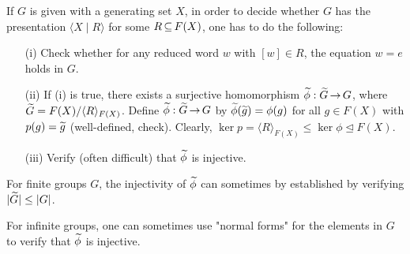 \documentclass[11pt]{book}
\theoremstyle{definition}   \newtheorem{defn}[counter]{Definition} %
\newcommand{\nsg}{\mathrel{\unlhd}}   \newcommand{\ind}{\parindent24pt}   \newcommand{\vn}{\varnothing}
\newcommand{\gen}[1]{\langle #1 \rangle}   \newcommand{\stab}[2]{\tn{Stab}_{#1}(#2)}   \newcommand{\fix}[2]{\tn{Fix}_{#1}(#2)}
\renewcommand{\arrowvert}{\arrow}   \renewcommand{\i}{\mathbf{i}}   \renewcommand{\j}{\mathbf{j}}   \renewcommand{\k}{\mathbf{k}}    \renewcommand{\H}{\mathbb{H}}
\DeclareMathOperator{\ra}{\rightarrow}   \DeclareMathOperator{\Poly}{\mathbf{P}}   \DeclareMathOperator{\spn}{\textnormal{span}}   \DeclareMathOperator{\aut}{\textnormal{Aut}}
\newcommand{\vs}{\vspace{8pt}}
\numberwithin{counter}{chapter}
\begin{document}
\begin{remark}
\begin{enumerate}
If $G$ is given with a generating set $X$, in order to decide whether $G$ has the presentation $\gen{X \mid R}$ for some $R \operatorname{\subseteq} F(X)$, one has to do the following:
\begin{enumerate}
\item[(i)] Check whether for any reduced word $w$ with $[w] \in R$, the equation $w = e$ holds in $G$.
\item[(ii)] If (i) is true, there exists a surjective homomorphism $\wt{\phi} : \wt{G} \ra G$, where $\wt{G} = F(X)/\gen{R}_{F(X)}$. Define $\wt{\phi} : \wt{G} \ra G$ by $\widetilde{\phi}(\widetilde{g}) = \phi(g)$ for all $g \in F(X)$ with $p(g) = \widetilde{g}$ (well-defined, check). Clearly, $\ker p = \gen{R}_{F(X)} \leq \ker \phi \nsg F(X)$.

\item[(iii)] Verify (often difficult) that $\widetilde{\phi}$ is injective.
\end{enumerate}

For finite groups $G$, the injectivity of $\widetilde{\phi}$ can sometimes by established by verifying $|\widetilde{G}| \leq |G|$.

For infinite groups, one can sometimes use "normal forms" for the elements in $G$ to verify that $\widetilde{\phi}$ is injective.
\end{enumerate}
\end{remark}

\vs
\end{document}
